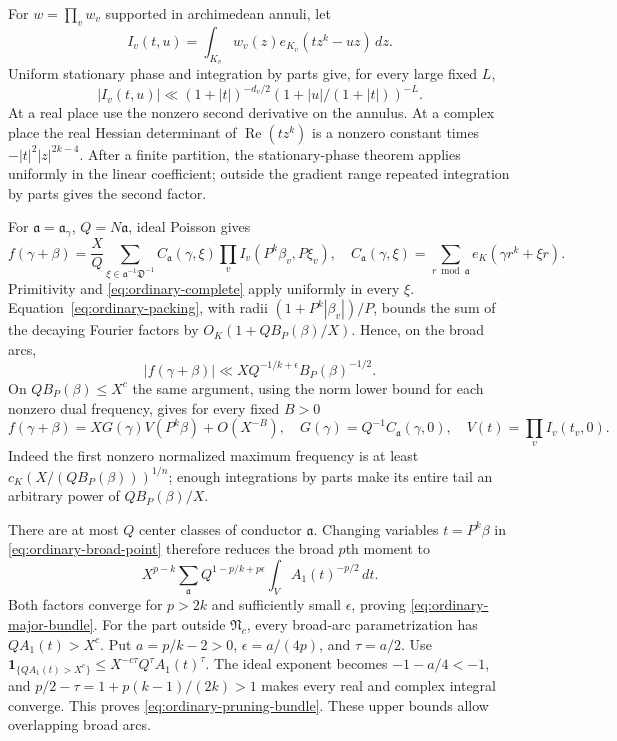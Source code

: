 \documentclass[11pt]{amsart}
\theoremstyle{definition}
\numberwithin{equation}{section}
\begin{document}
For $w=\prod_vw_v$ supported in archimedean annuli, let
\[
 I_v(t,u)=\int_{K_v}w_v(z)e_{K_v}(tz^k-uz)\,dz.
\]
Uniform stationary phase and integration by parts give, for every large fixed $L$,
\begin{equation}\label{eq:ordinary-stationary}
 |I_v(t,u)|\ll(1+|t|)^{-d_v/2}
                (1+|u|/(1+|t|))^{-L}.
\end{equation}
At a real place use the nonzero second derivative on the annulus.
At a complex place the real Hessian determinant of $\operatorname{Re}(tz^k)$
is a nonzero constant times $-|t|^2|z|^{2k-4}$.
After a finite partition, the stationary-phase theorem
\cite[Section~7.7]{Hormander2003} applies uniformly in the linear coefficient;
outside the gradient range repeated integration by parts gives the second factor.

For $\mathfrak a=\mathfrak a_\gamma$, $Q=N\mathfrak a$, ideal Poisson gives
\[
 f(\gamma+\beta)=\frac XQ
  \sum_{\xi\in\mathfrak a^{-1}\mathfrak D^{-1}}
    C_{\mathfrak a}(\gamma,\xi)
    \prod_v I_v(P^k\beta_v,P\xi_v),
 \quad
 C_{\mathfrak a}(\gamma,\xi)=
    \sum_{r\bmod\mathfrak a}e_K(\gamma r^k+\xi r).
\]
Primitivity and \eqref{eq:ordinary-complete} apply uniformly in every $\xi$.
Equation~\eqref{eq:ordinary-packing}, with radii
$(1+P^k|\beta_v|)/P$, bounds the sum of the decaying Fourier factors by
$O_K(1+QB_P(\beta)/X)$.
Hence, on the broad arcs,
\begin{equation}\label{eq:ordinary-broad-point}
 |f(\gamma+\beta)|\ll
       XQ^{-1/k+\epsilon}B_P(\beta)^{-1/2}.
\end{equation}
On $QB_P(\beta)\le X^c$ the same argument, using the norm lower bound for
each nonzero dual frequency, gives for every fixed $B>0$
\begin{equation}\label{eq:ordinary-core-formula}
 f(\gamma+\beta)=XG(\gamma)V(P^k\beta)+O(X^{-B}),
 \quad
 G(\gamma)=Q^{-1}C_{\mathfrak a}(\gamma,0),\quad
 V(t)=\prod_v I_v(t_v,0).
\end{equation}
Indeed the first nonzero normalized maximum frequency is at least
$c_K(X/(QB_P(\beta)))^{1/n}$; enough integrations by parts make its entire
tail an arbitrary power of $QB_P(\beta)/X$.

There are at most $Q$ center classes of conductor $\mathfrak a$.
Changing variables $t=P^k\beta$ in \eqref{eq:ordinary-broad-point} therefore
reduces the broad $p$th moment to
\[
 X^{p-k}\sum_{\mathfrak a}Q^{1-p/k+p\epsilon}
         \int_V A_1(t)^{-p/2}\,dt.
\]
Both factors converge for $p>2k$ and sufficiently small $\epsilon$, proving
\eqref{eq:ordinary-major-bundle}.
For the part outside $\mathfrak N_c$, every broad-arc parametrization has
$QA_1(t)>X^c$.  Put $a=p/k-2>0$, $\epsilon=a/(4p)$, and $\tau=a/2$.
Use
$\mathbf1_{\{QA_1(t)>X^c\}}\le X^{-c\tau}Q^\tau A_1(t)^\tau$.
The ideal exponent becomes $-1-a/4<-1$, and
$p/2-\tau=1+p(k-1)/(2k)>1$ makes every real and complex integral converge.
This proves \eqref{eq:ordinary-pruning-bundle}.
These upper bounds allow overlapping broad arcs.
\end{document}
